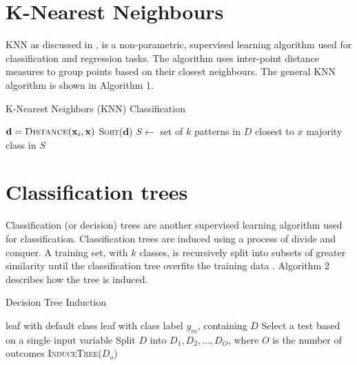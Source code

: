 \documentclass[conference]{IEEEtran}
\begin{document}
\section{K-Nearest Neighbours}
KNN as discussed in \cite{fund}, is a non-parametric, supervised learning algorithm used for classification and regression tasks.
The algorithm uses inter-point distance measures to group points based on their closest neighbours. The general KNN algorithm is shown in Algorithm 1.

\begin{algorithm}
\caption{K-Nearest Neighbors (KNN) Classification}
\begin{algorithmic}[1]
        \State $\mathbf{d} = \textsc{Distance}(\mathbf{x}_i, \mathbf{x})$
    \EndFor
    \State \textsc{Sort}($\mathbf{d}$)
    \State $S \gets$ set of $k$ patterns in $D$ closest to $x$
    \State \Return majority class in $S$ 
\EndFunction
\end{algorithmic}
\end{algorithm}

\section{Classification trees}

Classification (or decision) trees are another supervised learning algorithm used for classification.
Classification trees are induced using a process of divide and conquer.
A training set, with $k$ classes, is recursively split into subsets of greater similarity until the classification tree overfits the training data \cite{fund}.
Algorithm 2 describes how the tree is induced.

\begin{algorithm}
\caption{Decision Tree Induction}
\begin{algorithmic}[1]
     
        \State \Return leaf with default class
    \EndIf
     
        \State \Return leaf with class label $y_m$, containing $D$
    \EndIf
    \State Select a test based on a single input variable
    \State Split $D$ into $D_1, D_2, \ldots, D_O$, where $O$ is the number of outcomes
        \State \textsc{InduceTree}($D_o$)
    \EndFor
\EndFunction
\end{algorithmic}
\end{algorithm}
\end{document}

